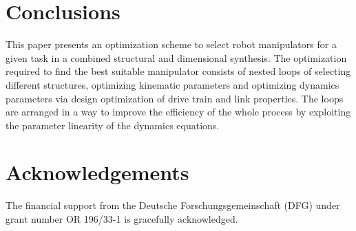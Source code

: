 \documentclass{svproc}
\begin{document}
\section{Conclusions}
\label{sec:Conclusion}



This paper presents an optimization scheme to select robot manipulators for a given task in a combined structural and dimensional synthesis.
The optimization required to find the best suitable manipulator consists of nested loops of selecting different structures, optimizing kinematic parameters and optimizing dynamics parameters via design optimization of drive train and link properties.
The loops are arranged in a way to improve the efficiency of the whole process by exploiting the parameter linearity of the dynamics equations.
\newpage
\section*{Acknowledgements}

The financial support from the Deutsche Forschungsgemeinschaft (DFG) under grant number OR 196/33-1 is gracefully acknowledged.



\end{document}
